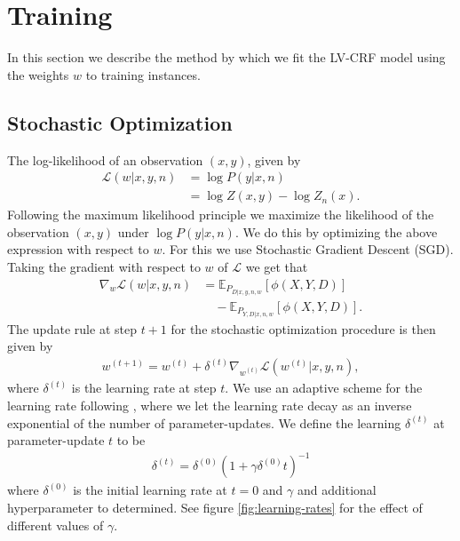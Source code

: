 \documentclass[11pt,a4paper]{article}
\begin{document}
\section{Training}

In this section we describe the method by which we fit the LV-CRF model using the weights $w$ to training instances.

\subsection{Stochastic Optimization}

The log-likelihood of an observation $(x,y)$, given by
\begin{align*}
\label{eq:log-likelihood}
\mathcal{L}(w|x,y,n) &= \log P(y|x, n) \\
    &= \log Z(x,y) - \log Z_n(x).
\end{align*}
Following the maximum likelihood principle we maximize the likelihood of the observation $(x,y)$ under $\log P(y|x, n)$. We do this by optimizing the above expression with respect to $w$. For this we use Stochastic Gradient Descent (SGD). Taking the gradient with respect to $w$ of $\mathcal{L}$ we get that
\begin{align*}
\nabla_w\mathcal{L}(w|x,y,n) 
    &= \mathbb{E}_{P_{D|x,y,n,w}}[\phi(X,Y,D)] \\
    &\quad- \mathbb{E}_{P_{Y, D|x,n,w}}[\phi(X,Y,D)].
\end{align*}
The update rule at step $t+1$ for the stochastic optimization procedure is then given by
\begin{align*}
    w^{(t+1)} = w^{(t)} + \delta^{(t)}\nabla_{w^{(t)}}\mathcal{L}(w^{(t)}|x,y,n),
\end{align*}
where $\delta^{(t)}$ is the learning rate at step $t$. We use an adaptive scheme for the learning rate following \cite{Bottou12}, where we let the learning rate decay as an inverse exponential of the number of parameter-updates. We define the learning $\delta^{(t)}$ at parameter-update $t$ to be
\begin{align*}
\delta^{(t)} = \delta^{(0)} (1 + \gamma\delta^{(0)} t)^{-1}
\end{align*}
where $\delta^{(0)}$ is the initial learning rate at $t=0$ and $\gamma$ and additional hyperparameter to determined. See figure  \ref{fig:learning-rates} for the effect of different values of $\gamma$.
\end{document}
